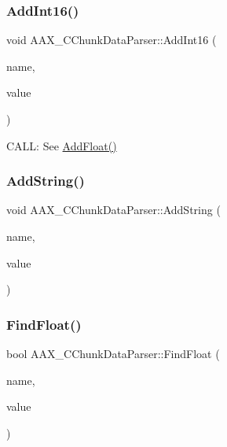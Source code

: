 \mbox{\label{a01461_a06541319eb6f0628d33518b0485cd8cc}} 
\subsubsection{\texorpdfstring{AddInt16()}{AddInt16()}}
{\footnotesize\ttfamily void A\+A\+X\+\_\+\+C\+Chunk\+Data\+Parser\+::\+Add\+Int16 (\begin{DoxyParamCaption}\item[{const char $\ast$}]{name,  }\item[{int16\+\_\+t}]{value }\end{DoxyParamCaption})}



C\+A\+LL\+: See \mbox{\hyperlink{a01461_aa85606ec7ad6e142abceb1097dcd2480}{Add\+Float()}} 

\mbox{\label{a01461_a8a06f076c8e1c93df9348857abf50e39}} 
\subsubsection{\texorpdfstring{AddString()}{AddString()}}
{\footnotesize\ttfamily void A\+A\+X\+\_\+\+C\+Chunk\+Data\+Parser\+::\+Add\+String (\begin{DoxyParamCaption}\item[{const char $\ast$}]{name,  }\item[{\mbox{\hyperlink{a01573}{A\+A\+X\+\_\+\+C\+String}}}]{value }\end{DoxyParamCaption})}

\mbox{\label{a01461_a0651792f378318532e5be3799b108e58}} 
\subsubsection{\texorpdfstring{FindFloat()}{FindFloat()}}
{\footnotesize\ttfamily bool A\+A\+X\+\_\+\+C\+Chunk\+Data\+Parser\+::\+Find\+Float (\begin{DoxyParamCaption}\item[{const char $\ast$}]{name,  }\item[{float $\ast$}]{value }\end{DoxyParamCaption})}



